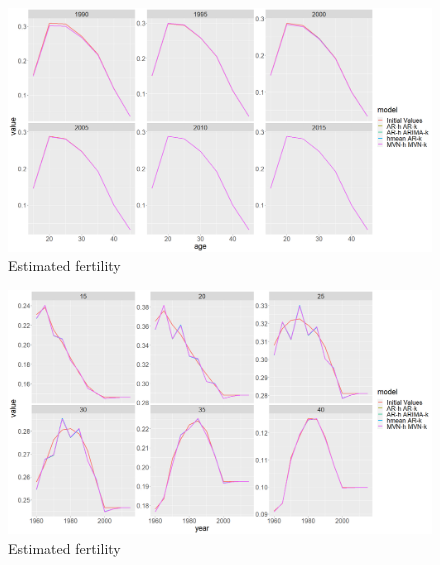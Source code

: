 \documentclass[12pt,a4paper]{article}
\begin{document}
\newpage
\begin{figure}[H]
\includegraphics[width = \linewidth]{Burkina Faso/6/period fx.png}
\caption{Estimated fertility}
\end{figure}
\begin{figure}[H]
\includegraphics[width = \linewidth]{Burkina Faso/6/age fx.png}
\caption{Estimated fertility}
\end{figure}
\end{document}
